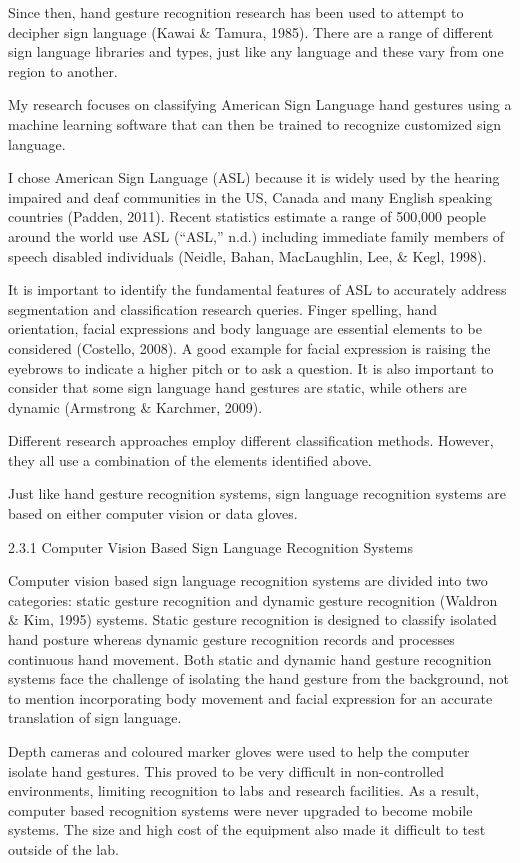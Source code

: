 Since then, hand gesture recognition research has been used to attempt to decipher sign language (Kawai \& Tamura, 1985). There are a range of different sign language libraries and types, just like any language and these vary from one region to another.

My research focuses on classifying American Sign Language hand gestures using a machine learning software that can then be trained to recognize customized sign language. 

I chose American Sign Language (ASL) because it is widely used by the hearing impaired and deaf communities in the US, Canada and many English speaking countries (Padden, 2011). Recent statistics estimate a range of 500,000 people around the world use ASL (``ASL,'' n.d.) including immediate family members of speech disabled individuals (Neidle, Bahan, MacLaughlin, Lee, \& Kegl, 1998).

It is important to identify the fundamental features of ASL to accurately address segmentation and classification research queries. Finger spelling, hand orientation, facial expressions and body language are essential elements to be considered (Costello, 2008). A good example for facial expression is raising the eyebrows to indicate a higher pitch or to ask a question. It is also important to consider that some sign language hand gestures are static, while others are dynamic (Armstrong \& Karchmer, 2009). 

Different research approaches employ different classification methods. However, they all use a combination of the elements identified above.

Just like hand gesture recognition systems, sign language recognition systems are based on either computer vision or data gloves.

2.3.1 Computer Vision Based Sign Language Recognition Systems 

Computer vision based sign language recognition systems are divided into two categories: static gesture recognition and dynamic gesture recognition (Waldron \& Kim, 1995) systems. Static gesture recognition is designed to classify isolated hand posture whereas dynamic gesture recognition records and processes continuous hand movement. Both static and dynamic hand gesture recognition systems face the challenge of isolating the hand gesture from the background, not to mention incorporating body movement and facial expression for an accurate translation of sign language. 

Depth cameras and coloured marker gloves were used to help the computer isolate hand gestures. This proved to be very difficult in non-controlled environments, limiting recognition to labs and research facilities. As a result, computer based recognition systems were never upgraded to become mobile systems. The size and high cost of the equipment also made it difficult to test outside of the lab.  


